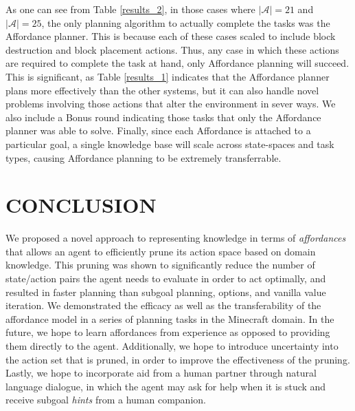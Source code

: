 \documentclass[]{article}
\begin{document}
As one can see from Table \ref{results_2}, in those cases where $|\mathcal{A}| = 21$ and $|\mathcal{A}| = 25$, the only planning algorithm to actually complete the tasks was the Affordance planner. This is because each of these cases scaled to include block destruction and block placement actions. Thus, any case in which these actions are required to complete the task at hand, only Affordance planning will succeed. This is significant, as Table \ref{results_1} indicates that the Affordance planner plans more effectively than the other systems, but it can also handle novel problems involving those actions that alter the environment in sever ways. We also include a Bonus round indicating those tasks that only the Affordance planner was able to solve. Finally, since each Affordance is attached to a particular goal, a single knowledge base will scale across state-spaces and task types, causing Affordance planning to be extremely transferrable.


\section{CONCLUSION}

We proposed a novel approach to representing
knowledge in terms of {\em
  affordances}~\citep{gibson77} that allows an agent to efficiently prune its
action space based on domain knowledge. This pruning was shown to significantly
reduce the number of state/action pairs the agent needs to evaluate
in order to act optimally, and resulted in faster planning than subgoal planning, options,
and vanilla value iteration. We demonstrated the efficacy as well as the 
transferability of the affordance model in a series of planning tasks in the Minecraft domain.
In the future, we hope to learn affordances from experience as opposed to providing them directly
to the agent. Additionally, we hope to introduce uncertainty into the action set that is 
pruned, in order to improve the effectiveness of the pruning. Lastly, we 
hope to incorporate aid from a human partner through natural language dialogue, in which
the agent may ask for help when it is stuck and receive subgoal {\it hints} from a human
companion.


  
\end{document}
